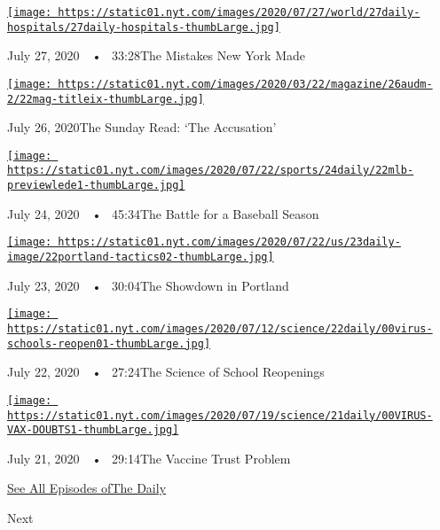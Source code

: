 \href{https://www.nytimes.com/2020/07/27/podcasts/the-daily/new-york-hospitals-covid.html?action=click\&module=audio-series-bar\&region=header\&pgtype=Article}{\texttt{[image: https://static01.nyt.com/images/2020/07/27/world/27daily-hospitals/27daily-hospitals-thumbLarge.jpg]}}

July 27, 2020~~•~ 33:28The Mistakes New York Made

\href{https://www.nytimes.com/2020/07/26/podcasts/the-daily/the-accusation-the-sunday-read.html?action=click\&module=audio-series-bar\&region=header\&pgtype=Article}{\texttt{[image: https://static01.nyt.com/images/2020/03/22/magazine/26audm-2/22mag-titleix-thumbLarge.jpg]}}

July 26, 2020The Sunday Read: `The Accusation'

\href{https://www.nytimes.com/2020/07/24/podcasts/the-daily/mlb-baseball-season-coronavirus.html?action=click\&module=audio-series-bar\&region=header\&pgtype=Article}{\texttt{[image: https://static01.nyt.com/images/2020/07/22/sports/24daily/22mlb-previewlede1-thumbLarge.jpg]}}

July 24, 2020~~•~ 45:34The Battle for a Baseball Season

\href{https://www.nytimes.com/2020/07/23/podcasts/the-daily/portland-protests.html?action=click\&module=audio-series-bar\&region=header\&pgtype=Article}{\texttt{[image: https://static01.nyt.com/images/2020/07/22/us/23daily-image/22portland-tactics02-thumbLarge.jpg]}}

July 23, 2020~~•~ 30:04The Showdown in Portland

\href{https://www.nytimes.com/2020/07/22/podcasts/the-daily/school-reopenings-coronavirus.html?action=click\&module=audio-series-bar\&region=header\&pgtype=Article}{\texttt{[image: https://static01.nyt.com/images/2020/07/12/science/22daily/00virus-schools-reopen01-thumbLarge.jpg]}}

July 22, 2020~~•~ 27:24The Science of School Reopenings

\href{https://www.nytimes.com/2020/07/21/podcasts/the-daily/coronavirus-vaccine.html?action=click\&module=audio-series-bar\&region=header\&pgtype=Article}{\texttt{[image: https://static01.nyt.com/images/2020/07/19/science/21daily/00VIRUS-VAX-DOUBTS1-thumbLarge.jpg]}}

July 21, 2020~~•~ 29:14The Vaccine Trust Problem

\href{https://www.nytimes.com/column/the-daily}{See All Episodes ofThe
Daily}

Next

